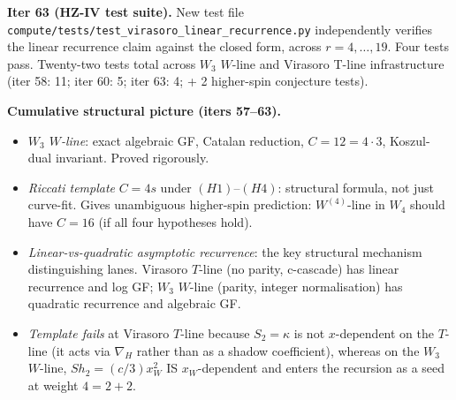 \documentclass[11pt]{article}
\begin{document}
\textbf{Iter 63 (HZ-IV test suite).} New test file
\texttt{compute/tests/test\_virasoro\_linear\_recurrence.py}
independently verifies the linear recurrence claim against the
closed form, across $r = 4, \ldots, 19$. Four tests pass.
Twenty-two tests total across $W_3$ $W$-line and Virasoro
T-line infrastructure (iter 58: 11; iter 60: 5; iter 63: 4;
+ 2 higher-spin conjecture tests).

\textbf{Cumulative structural picture (iters 57--63).}
\begin{itemize}
  \item \emph{$W_3$ $W$-line}: exact algebraic GF, Catalan
        reduction, $C = 12 = 4 \cdot 3$, Koszul-dual invariant.
        Proved rigorously.
  \item \emph{Riccati template} $C = 4 s$ under $(H1)$--$(H4)$:
        structural formula, not just curve-fit. Gives
        unambiguous higher-spin prediction: $W^{(4)}$-line in
        $W_4$ should have $C = 16$ (if all four hypotheses
        hold).
  \item \emph{Linear-vs-quadratic asymptotic recurrence}: the
        key structural mechanism distinguishing lanes. Virasoro
        $T$-line (no parity, c-cascade) has linear recurrence
        and log GF; $W_3$ $W$-line (parity, integer
        normalisation) has quadratic recurrence and algebraic
        GF.
  \item \emph{Template fails} at Virasoro $T$-line because
        $S_2 = \kappa$ is not $x$-dependent on the $T$-line
        (it acts via $\nabla_H$ rather than as a shadow
        coefficient), whereas on the $W_3$ $W$-line,
        $Sh_2 = (c/3) x_W^2$ IS $x_W$-dependent and enters
        the recursion as a seed at weight $4 = 2 + 2$.
\end{itemize}
\end{document}
